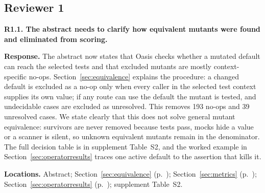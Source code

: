 \subsection*{Reviewer 1}
\noindent\textbf{R1.1. The abstract needs to clarify how equivalent mutants were found and eliminated from scoring.}\par
\textbf{Response.} The abstract now states that Oasis checks whether a mutated default can reach the selected tests and that excluded mutants are mostly context-specific no-ops. Section~\ref{sec:equivalence} explains the procedure: a changed default is excluded as a no-op only when every caller in the selected test context supplies its own value; if any route can use the default the mutant is tested, and undecidable cases are excluded as unresolved. This removes 193 no-ops and 39 unresolved cases. We state clearly that this does not solve general mutant equivalence: survivors are never removed because tests pass, mocks hide a value or a scanner is silent, so unknown equivalent mutants remain in the denominator. The full decision table is in supplement Table~S2, and the worked example in Section~\ref{sec:operatorresults} traces one active default to the assertion that kills it.\par
\textbf{Locations.} Abstract; Section~\ref{sec:equivalence} (p.~\pageref{sec:equivalence}); Section~\ref{sec:metrics} (p.~\pageref{sec:metrics}); Section~\ref{sec:operatorresults} (p.~\pageref{sec:operatorresults}); supplement Table~S2.

